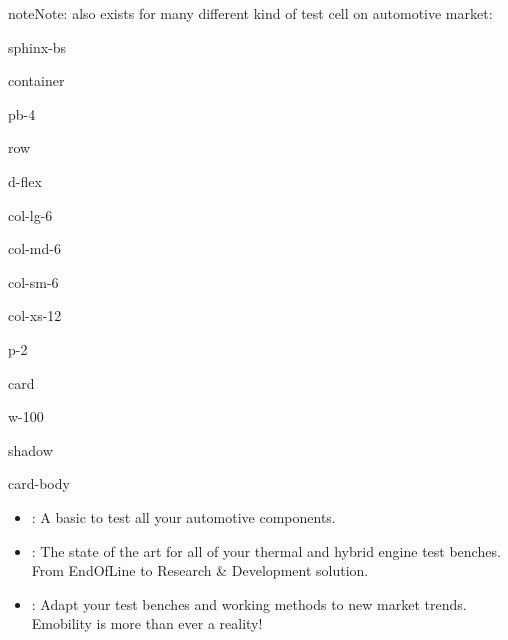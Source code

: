 \documentclass[letterpaper,10pt,english]{jupyterBook}
\begin{document}
\begin{sphinxadmonition}{note}{Note:}
\sphinxAtStartPar
{} also exists for many different kind of test cell on automotive market:

\begin{sphinxuseclass}{sphinx-bs}
\begin{sphinxuseclass}{container}
\begin{sphinxuseclass}{pb-4}
\begin{sphinxuseclass}{row}
\begin{sphinxuseclass}{d-flex}
\begin{sphinxuseclass}{col-lg-6}
\begin{sphinxuseclass}{col-md-6}
\begin{sphinxuseclass}{col-sm-6}
\begin{sphinxuseclass}{col-xs-12}
\begin{sphinxuseclass}{p-2}
\begin{sphinxuseclass}{card}
\begin{sphinxuseclass}{w-100}
\begin{sphinxuseclass}{shadow}
\begin{sphinxuseclass}{card-body}\begin{itemize}
\item {} 
\sphinxAtStartPar
{} : A basic to test all your automotive components.

\item {} 
\sphinxAtStartPar
{} : The state of the art for all of your thermal and hybrid engine test benches. From End\sphinxhyphen{}Of\sphinxhyphen{}Line to Research \& Development solution.

\item {} 
\sphinxAtStartPar
{} : Adapt your test benches and working methods to new market trends. E\sphinxhyphen{}mobility is more than ever a reality!

\end{itemize}


\end{sphinxuseclass}
\end{sphinxuseclass}
\end{sphinxuseclass}
\end{sphinxuseclass}
\end{sphinxuseclass}
\end{sphinxuseclass}
\end{sphinxuseclass}
\end{sphinxuseclass}
\end{sphinxuseclass}
\end{sphinxuseclass}
\end{sphinxuseclass}
\end{sphinxuseclass}
\end{sphinxuseclass}
\end{sphinxuseclass}
\end{sphinxadmonition}
\end{document}
